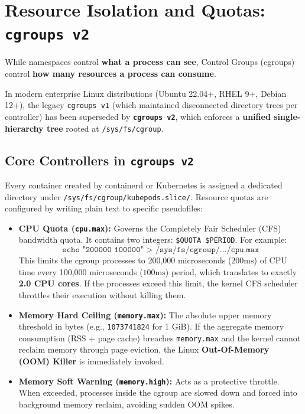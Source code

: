 \section{Resource Isolation and Quotas: \texttt{cgroups v2}}

While namespaces control \textbf{what a process can see}, Control Groups (cgroups) control \textbf{how many resources a process can consume}. 

In modern enterprise Linux distributions (Ubuntu 22.04+, RHEL 9+, Debian 12+), the legacy \texttt{cgroups v1} (which maintained disconnected directory trees per controller) has been superseded by \textbf{\texttt{cgroups v2}}, which enforces a \textbf{unified single-hierarchy tree} rooted at \texttt{/sys/fs/cgroup}.

\subsection{Core Controllers in \texttt{cgroups v2}}
Every container created by containerd or Kubernetes is assigned a dedicated directory under \texttt{/sys/fs/cgroup/kubepods.slice/}. Resource quotas are configured by writing plain text to specific pseudofiles:

\begin{itemize}[leftmargin=12pt]
  \item \textbf{CPU Quota (\texttt{cpu.max}):} Governs the Completely Fair Scheduler (CFS) bandwidth quota. It contains two integers: \texttt{\$QUOTA \$PERIOD}. For example:
  \begin{equation*}
  \texttt{echo "200000 100000" > /sys/fs/cgroup/.../cpu.max}
  \end{equation*}
  This limits the cgroup processes to 200,000 microseconds ($200\text{ms}$) of CPU time every 100,000 microseconds ($100\text{ms}$) period, which translates to exactly \textbf{2.0 CPU cores}. If the processes exceed this limit, the kernel CFS scheduler throttles their execution without killing them.
  \item \textbf{Memory Hard Ceiling (\texttt{memory.max}):} The absolute upper memory threshold in bytes (e.g., \texttt{1073741824} for 1 GiB). If the aggregate memory consumption (RSS + page cache) breaches \texttt{memory.max} and the kernel cannot reclaim memory through page eviction, the Linux \textbf{Out-Of-Memory (OOM) Killer} is immediately invoked.
  \item \textbf{Memory Soft Warning (\texttt{memory.high}):} Acts as a protective throttle. When exceeded, processes inside the cgroup are slowed down and forced into background memory reclaim, avoiding sudden OOM spikes.
\end{itemize}

